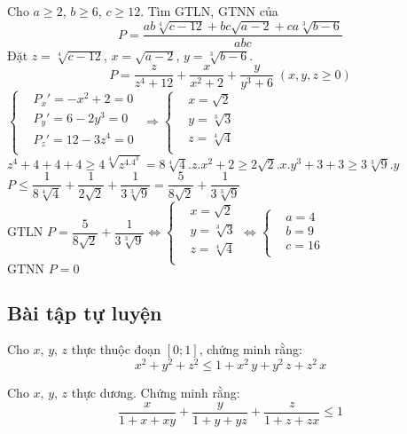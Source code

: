 \begin{bt}%
Cho	$a \geq 2$, $b \geq 6$, $c \geq 12$.
Tìm GTLN, GTNN của 
$$ P = \dfrac{ab\sqrt[4]{c-12}+bc\sqrt{a-2}+ca\sqrt[3]{b-6}}{abc}$$
	\loigiai
	{
		Đặt $z=\sqrt[4]{c-12}$, $x=\sqrt{a-2}$, $y=\sqrt[3]{b-6}$.
		$$P=\dfrac{z}{z^4+12}+\dfrac{x}{x^2+2}+\dfrac{y}{y^3+6} \; (x, y, z \geq 0)$$
		$\left\{\begin{aligned}
		&P_x ' = -x^2+2=0\\
		&P_y ' = 6-2y^3=0\\
		&P_z ' = 12-3z^4=0\\
		\end{aligned}\right.$ $\Rightarrow \left\{\begin{aligned}
		&x=\sqrt{2}\\
		&y=\sqrt[3]{3}\\
		&z=\sqrt[4]{4}\\
		\end{aligned}\right.$\\
		$z^4+4+4+4 \geq 4\sqrt[4]{z^4.4^3}=8\sqrt[4]{4}.z.x^2 + 2 \geq 2\sqrt{2}.x.y^3+3+3 \geq 3\sqrt[3]{9}.y$\\
		$P \leq \dfrac{1}{8\sqrt[4]{4}}+\dfrac{1}{2\sqrt{2}}+\dfrac{1}{3\sqrt[3]{9}}=\dfrac{5}{8\sqrt{2}}+\dfrac{1}{3\sqrt[3]{9}}$\\
		$\text{GTLN } P = \dfrac{5}{8\sqrt{2}}+\dfrac{1}{3\sqrt[3]{9}} \Leftrightarrow \left\{\begin{aligned}
		&x=\sqrt{2}\\
		&y=\sqrt[3]{3}\\
		&z=\sqrt[4]{4}\\
		\end{aligned}\right. \Leftrightarrow \left\{\begin{aligned}
		&a=4\\
		&b=9\\
		&c=16\\
		\end{aligned}\right.$\\
		$\text{GTNN } P= 0$
	}
\end{bt}

\subsection{Bài tập tự luyện} 
\begin{bt}
Cho $x,\,y,\,z$ thực thuộc đoạn $\left[0;1\right]$, chứng minh rằng:$$x^{2}+y^{2}+z^{2} \leq 1+x^{2}\,y+y^{2}\,z+z^{2}\,x$$
\end{bt}
\begin{bt}
	Cho $x,\,y,\,z$ thực dương. Chứng minh rằng:$$\dfrac{x}{1+x+xy}+\dfrac{y}{1+y+yz}+\dfrac{z}{1+z+zx} \leq 1$$
\end{bt}

